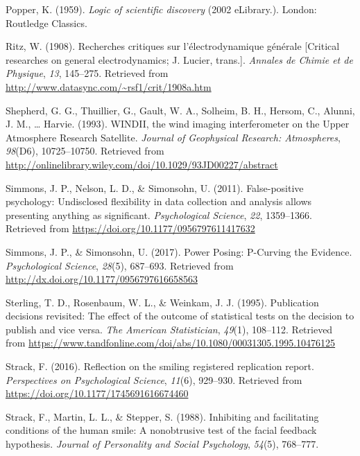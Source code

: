 \documentclass[english,floatsintext,man]{apa6}
\theoremstyle{definition}
\theoremstyle{definition}
\theoremstyle{definition}
\theoremstyle{remark}
\begin{document}
\leavevmode\hypertarget{ref-Popper:1959}{}%
Popper, K. (1959). \emph{Logic of scientific discovery} (2002
eLibrary.). London: Routledge Classics.

\leavevmode\hypertarget{ref-Ritz:1908}{}%
Ritz, W. (1908). Recherches critiques sur l'électrodynamique générale
{[}Critical researches on general electrodynamics; J. Lucier, trans.{]}.
\emph{Annales de Chimie et de Physique}, \emph{13}, 145--275. Retrieved
from \url{http://www.datasync.com/~rsf1/crit/1908a.htm}

\leavevmode\hypertarget{ref-Shepherd:etal:1993}{}%
Shepherd, G. G., Thuillier, G., Gault, W. A., Solheim, B. H., Hersom,
C., Alunni, J. M., \ldots{} Harvie. (1993). WINDII, the wind imaging
interferometer on the Upper Atmosphere Research Satellite. \emph{Journal
of Geophysical Research: Atmospheres}, \emph{98}(D6), 10725--10750.
Retrieved from
\url{http://onlinelibrary.wiley.com/doi/10.1029/93JD00227/abstract}

\leavevmode\hypertarget{ref-Simmons:etal:2011}{}%
Simmons, J. P., Nelson, L. D., \& Simonsohn, U. (2011). False-positive
psychology: Undisclosed flexibility in data collection and analysis
allows presenting anything as significant. \emph{Psychological Science},
\emph{22}, 1359--1366. Retrieved from
\url{https://doi.org/10.1177/0956797611417632}

\leavevmode\hypertarget{ref-Simmons:Simonsohn:2017}{}%
Simmons, J. P., \& Simonsohn, U. (2017). Power Posing: P-Curving the
Evidence. \emph{Psychological Science}, \emph{28}(5), 687--693.
Retrieved from \url{http://dx.doi.org/10.1177/0956797616658563}

\leavevmode\hypertarget{ref-Sterling:etal:1995}{}%
Sterling, T. D., Rosenbaum, W. L., \& Weinkam, J. J. (1995). Publication
decisions revisited: The effect of the outcome of statistical tests on
the decision to publish and vice versa. \emph{The American
Statistician}, \emph{49}(1), 108--112. Retrieved from
\url{https://www.tandfonline.com/doi/abs/10.1080/00031305.1995.10476125}

\leavevmode\hypertarget{ref-Strack:2016}{}%
Strack, F. (2016). Reflection on the smiling registered replication
report. \emph{Perspectives on Psychological Science}, \emph{11}(6),
929--930. Retrieved from \url{https://doi.org/10.1177/1745691616674460}

\leavevmode\hypertarget{ref-Strack:etal:1988}{}%
Strack, F., Martin, L. L., \& Stepper, S. (1988). Inhibiting and
facilitating conditions of the human smile: A nonobtrusive test of the
facial feedback hypothesis. \emph{Journal of Personality and Social
Psychology}, \emph{54}(5), 768--777.
\end{document}
